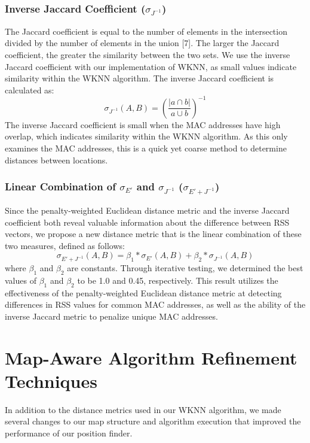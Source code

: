 \documentclass[conference]{IEEEtran}
\begin{document}
\subsubsection{Inverse Jaccard Coefficient ($\sigma_{J^{-1}}$)}
\indent The Jaccard coefficient is equal to the number of elements in the intersection divided by the number of elements in the union [7]. The larger the Jaccard coefficient, the greater the similarity between the two sets. We use the inverse Jaccard coefficient with our implementation of WKNN, as small values indicate similarity within the WKNN algorithm. The inverse Jaccard coefficient is calculated as:  
\begin{equation}
\label{jaccard}
\sigma_{J^{-1}}(A, B) = (\frac{|a\cap b|}{a\cup b})^{-1}
\end{equation}
The inverse Jaccard coefficient is small when the MAC addresses have high overlap, which indicates similarity within the WKNN algorithm. As this only examines the MAC addresses, this is a quick yet coarse method to determine distances between locations.

\subsubsection{Linear Combination of $\sigma_{E'}$ and $\sigma_{J^{-1}}$ ($\sigma_{E' + J^{-1}}$)}
\indent Since the penalty-weighted Euclidean distance metric and the inverse Jaccard coefficient both reveal valuable information about the difference between RSS vectors, we propose a new distance metric that is the linear combination of these two measures, defined as follows:
\begin{equation}
\label{combined}
\sigma_{E'+J^{-1}}(A, B) = \beta_1*\sigma_{E'}(A, B)+\beta_2*\sigma_{J^{-1}}(A, B)
\end{equation}
\indent where $\beta_1$ and $\beta_2$ are constants. Through iterative testing, we determined the best values of $\beta_1$ and $\beta_2$ to be 1.0 and 0.45, respectively. This result utilizes the effectiveness of the penalty-weighted Euclidean distance metric at detecting differences in RSS values for common MAC addresses, as well as the ability of the inverse Jaccard metric to penalize unique MAC addresses.

\section{Map-Aware Algorithm Refinement Techniques}

In addition to the distance metrics used in our WKNN algorithm, we made several changes to our map structure and algorithm execution that improved the performance of our position finder. 
\end{document}
